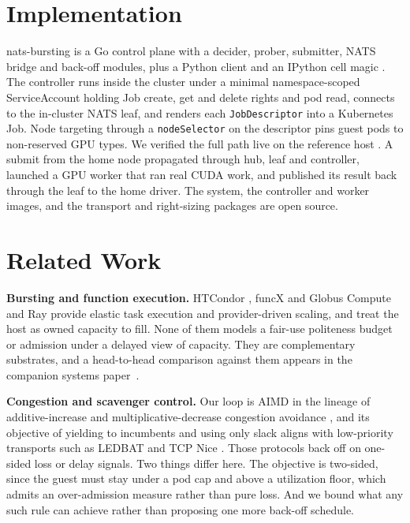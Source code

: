 \documentclass[10pt,conference,letterpaper]{IEEEtran}
\theoremstyle{remark}\newtheorem{remark}{Remark}
\newif\ifblind
\newcommand{\sysname}{\ifblind PoliteBurst\else nats-bursting\fi}
\begin{document}
\section{Implementation}
\label{sec:impl}
\sysname{} is a Go control plane with a decider, prober, submitter, NATS bridge
and back-off modules, plus a Python client and an IPython cell magic
\cite{natsbursting}. The controller runs inside the cluster under a minimal
namespace-scoped ServiceAccount holding Job create, get and delete rights and pod
read, connects to the in-cluster NATS leaf, and renders each
\texttt{JobDescriptor} into a Kubernetes Job. Node targeting through a
\texttt{nodeSelector} on the descriptor pins guest pods to non-reserved GPU
types. We verified the full path live on the reference host \cite{nautilus}. A
submit from the home node propagated through hub, leaf and controller, launched a
GPU worker that ran real CUDA work, and published its result back through the
leaf to the home driver. The system, the controller and worker images, and the
transport and right-sizing packages \cite{turboquantpro,batchprobe} are
\ifblind available as open-source artifacts, with repositories anonymized for
review\else open source\fi.



\section{Related Work}
\label{sec:related}
\textbf{Bursting and function execution.} HTCondor \cite{htcondor}, funcX and
Globus Compute \cite{funcx} and Ray \cite{ray} provide elastic task execution and
provider-driven scaling, and treat the host as owned capacity to fill. None of them models a fair-use politeness
budget or admission under a delayed view of capacity. They are complementary
substrates, and a head-to-head comparison against them appears in the companion
systems paper~\cite{companion}.

\textbf{Congestion and scavenger control.} Our loop is AIMD in the lineage of
additive-increase and multiplicative-decrease congestion avoidance
\cite{chiujain}, and its objective of yielding to incumbents and using only slack
aligns with low-priority transports such as LEDBAT \cite{ledbat} and TCP Nice
\cite{tcpnice}. Those protocols back off on one-sided loss or delay signals. Two
things differ here. The objective is two-sided, since the guest must stay under a
pod cap and above a utilization floor, which admits an over-admission measure
rather than pure loss. And we bound what any such rule can achieve rather than
proposing one more back-off schedule.
\end{document}
